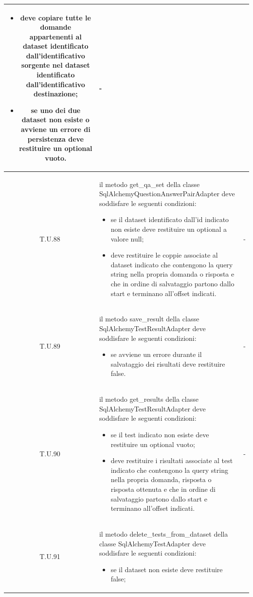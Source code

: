 \begin{tabularx}{\textwidth}{|c|X|c|}
\begin{itemize}
        \item deve copiare tutte le domande appartenenti al dataset identificato dall'identificativo sorgente nel dataset identificato dall'identificativo destinazione;
        \item se uno dei due dataset non esiste o avviene un errore di persistenza deve restituire un optional vuoto. 
    \end{itemize} & - \\
    \hline 
    \label{tu:tu88} T.U.88 & il metodo get\_qa\_set della classe SqlAlchemyQuestionAnswerPairAdapter deve soddisfare le seguenti condizioni:
    \begin{itemize}
        \item se il dataset identificato dall'id indicato non esiste deve restituire un optional a valore null;
        \item deve restituire le coppie associate al dataset indicato che contengono la query string nella propria domanda o risposta e che in ordine di salvataggio partono dallo start e terminano all'offset indicati.
    \end{itemize} & - \\
    \hline 
    \label{tu:tu89} T.U.89 & il metodo save\_result della classe SqlAlchemyTestResultAdapter deve soddisfare le seguenti condizioni:
    \begin{itemize}
        \item se avviene un errore durante il salvataggio dei risultati deve restituire false.  
    \end{itemize} & - \\
    \hline 
    \label{tu:tu90} T.U.90 & il metodo get\_results della classe SqlAlchemyTestResultAdapter deve soddisfare le seguenti condizioni:
    \begin{itemize}
        \item se il test indicato non esiste deve restituire un optional vuoto;
        \item deve restituire i risultati associate al test indicato che contengono la query string nella propria domanda, risposta o risposta ottenuta e che in ordine di salvataggio partono dallo start e terminano all'offset indicati.
    \end{itemize} & - \\
    \hline 
    \label{tu:tu91} T.U.91 & il metodo delete\_tests\_from\_dataset della classe SqlAlchemyTestAdapter deve soddisfare le seguenti condizioni:
    \begin{itemize}
        \item se il dataset non esiste deve restituire false;

\end{itemize}
\end{tabularx}
